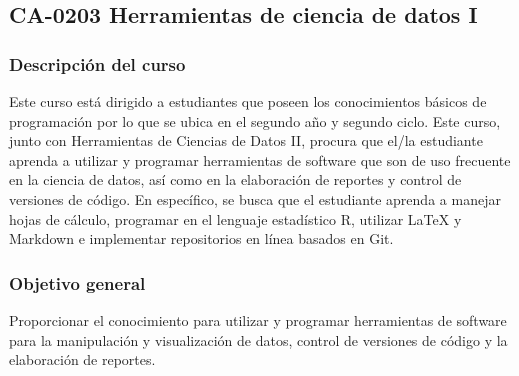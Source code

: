 \newpage
\subsection*{CA-0203 Herramientas de ciencia de datos I}

\hypertarget{MA0404}{}
\begin{refsection}
\begin{table}[H]
\end{table}

\subsubsection*{Descripción del curso}

Este curso está dirigido a estudiantes que poseen los conocimientos básicos de programación por lo que se ubica en el segundo año y segundo ciclo. Este curso, junto con Herramientas de Ciencias de Datos II, procura que el/la estudiante aprenda a utilizar y programar herramientas de software que son de uso frecuente en la ciencia de datos, así como en la elaboración de reportes y control de versiones de código. En específico, se busca que el estudiante aprenda a manejar hojas de cálculo, programar en el lenguaje estadístico R, utilizar \LaTeX{} y Markdown e implementar repositorios en línea basados en Git.

\subsubsection*{Objetivo general}

Proporcionar el conocimiento para utilizar y programar herramientas de software para la manipulación y visualización de datos, control de versiones de código y la elaboración de reportes.


\end{refsection}
